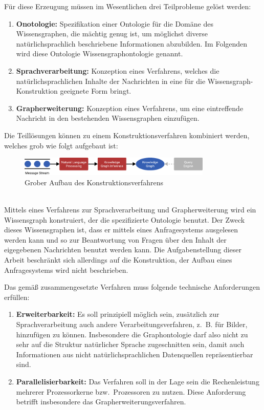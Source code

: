 Für diese Erzeugung müssen im Wesentlichen drei Teilprobleme gelöst werden:
\begin{enumerate}
	\item \textbf{Onotologie:}
		Spezifikation einer Ontologie für die Domäne des Wissensgraphen, die mächtig genug ist, um möglichst diverse natürlichsprachlich beschriebene Informationen abzubilden.
		Im Folgenden wird diese Ontologie Wissensgraphontologie genannt.
	\item \textbf{Sprachverarbeitung:}
		Konzeption eines Verfahrens, welches die natürlichsprachlichen Inhalte der Nachrichten in eine für die Wissensgraph-Konstruktion geeignete Form bringt.
	\item \textbf{Grapherweiterung:}
		Konzeption eines Verfahrens, um eine eintreffende Nachricht in den bestehenden Wissensgraphen einzufügen.
\end{enumerate}
Die Teillösungen können zu einem Konstruktionsverfahren kombiniert werden, welches grob wie folgt aufgebaut ist:
\begin{figure}[h]
	\centering
	\includegraphics[width=0.82\textwidth]{gfx/introduction/overview.pdf}
	\caption{Grober Aufbau des Konstruktionsverfahrens}\label{fig:intro:overview}
\end{figure} \\
Mittels eines Verfahrens zur Sprachverarbeitung und Grapherweiterung wird ein Wissensgraph konstruiert, der die spezifizierte Ontologie benutzt.
Der Zweck dieses Wissensgraphen ist, dass er mittels eines Anfragesystems ausgelesen werden kann und so zur Beantwortung von Fragen über den Inhalt der eigegebenen Nachrichten benutzt werden kann.
Die Aufgabenstellung dieser Arbeit beschränkt sich allerdings auf die Konstruktion, der Aufbau eines Anfragesystems wird nicht beschrieben.

Das gemäß  zusammengesetzte Verfahren muss folgende technische Anforderungen erfüllen:
\begin{enumerate}
	\item \textbf{Erweiterbarkeit:}
		Es soll prinzipiell möglich sein, zusätzlich zur Sprachverarbeitung auch andere Verarbeitungsverfahren, z.~B. für Bilder, hinzufügen zu können.
		Insbesondere die Graphontologie darf also nicht zu sehr auf die Struktur natürlicher Sprache zugeschnitten sein, damit auch Informationen aus nicht natürlichsprachlichen Datenquellen repräsentierbar sind.
	\item \textbf{Parallelisierbarkeit:}
		Das Verfahren soll in der Lage sein die Rechenleistung mehrerer Prozessorkerne bzw.\ Prozessoren zu nutzen.
		Diese Anforderung betrifft insbesondere das Grapherweiterungsverfahren.
\end{enumerate}

